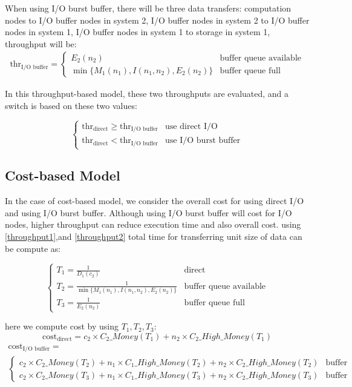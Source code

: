 When using I/O burst buffer, there will be three data transfers: computation nodes to I/O buffer nodes in system 2, I/O buffer nodes in system 2 to I/O buffer nodes in system 1, I/O buffer nodes in system 1 to storage in system 1, throughput will be:
\begin{eqnarray}
	\text{thr}_{\text{I/O buffer}}=\begin{cases}
		E_2(n_2) &\text{buffer queue available}\\ 
	\min\{M_1(n_1),I(n_1,n_2),E_2(n_2)\} &\text{buffer queue full}
	\end{cases} \label{throughput2}
\end{eqnarray}

In this throughput-based model, these two throughputs are evaluated, and a switch is based on these two values:

\begin{equation}
	\begin{cases}
		\text{thr}_{\text{direct}} \geq \text{thr}_{\text{I/O buffer}} & \text{use direct I/O}\\
		\text{thr}_{\text{direct}} < \text{thr}_{\text{I/O buffer}} & \text{use I/O burst buffer}
	\end{cases}
\end{equation}

\subsection{Cost-based Model}
In the case of cost-based model, we consider the overall cost for using direct I/O and using I/O burst buffer. Although using I/O burst buffer will cost for I/O nodes, higher throughput can reduce execution time and also overall cost.
using \ref{throughput1},and \ref{throughput2} total time for transferring unit size of data can be compute as:

\begin{equation}
	\begin{cases}
		T_1=\frac{1}{D_1(c_2)} & \text{direct}\\
		T_2=\frac{1}{\min\{M_1(n_1),I(n_1,n_2),E_2(n_2)\}} &\text{buffer queue available}\\
		T_3=\frac{1}{E_2(n_2)} &\text{buffer queue full}
	\end{cases}
\end{equation}

here we compute cost by using $T_1,T_2,T_3$:
\begin{equation}
	\text{cost}_\text{direct}=c_2\times C_2\_Money(T_1)+n_2\times C_2\_High\_Money(T_1)
\end{equation}
\begin{align}
	\text{cost}_\text{I/O buffer}=\\\begin{cases}
				c_2\times C_2\_Money(T_2)+n_1\times C_1\_High\_Money(T_2)+n_2\times C_2\_High\_Money(T_2)&\text{buffer queue available}\\
				c_2\times C_2\_Money(T_3)+n_1\times C_1\_High\_Money(T_3)+n_2\times C_2\_High\_Money(T_3) &\text{buffer queue full}
\end{cases}
\end{align}


